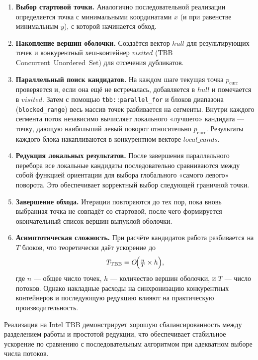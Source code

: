 \documentclass[12pt,a4paper]{article}
\begin{document}
\begin{enumerate}
  \item \textbf{Выбор стартовой точки.}  
    Аналогично последовательной реализации определяется точка с минимальными координатами \(x\) (и при равенстве минимальным \(y\)), с которой начинается обход.

  \item \textbf{Накопление вершин оболочки.}  
    Создаётся вектор \(\mathit{hull}\) для результирующих точек и конкурентный хеш‑контейнер \(\mathit{visited}\) (TBB Concurrent Unordered Set) для отсечения дубликатов.

  \item \textbf{Параллельный поиск кандидатов.}  
    На каждом шаге текущая точка \(p_{\mathrm{curr}}\) проверяется и, если она ещё не встречалась, добавляется в \(\mathit{hull}\) и помечается в \(\mathit{visited}\).  
    Затем с помощью \texttt{tbb::parallel\_for} и блоков диапазона (\texttt{blocked\_range}) весь массив точек разбивается на сегменты. Внутри каждого сегмента поток независимо вычисляет локального «лучшего» кандидата — точку, дающую наибольший левый поворот относительно \(p_{\mathrm{curr}}\). Результаты каждого блока накапливаются в конкурентном векторе \(\mathit{local\_cands}\).

  \item \textbf{Редукция локальных результатов.}  
    После завершения параллельного перебора все локальные кандидаты последовательно сравниваются между собой функцией ориентации для выбора глобального «самого левого» поворота. Это обеспечивает корректный выбор следующей граничной точки.

  \item \textbf{Завершение обхода.}  
    Итерации повторяются до тех пор, пока вновь выбранная точка не совпадёт со стартовой, после чего формируется окончательный список вершин выпуклой оболочки.

  \item \textbf{Асимптотическая сложность.}  
    При расчёте кандидатов работа разбивается на \(T\) блоков, что теоретически даёт ускорение до
    \[
      T_{\mathrm{TBB}} = O\!\Bigl(\tfrac{n}{T}\times h\Bigr),
    \]
    где \(n\) — общее число точек, \(h\) — количество вершин оболочки, и \(T\) — число потоков.  
    Однако накладные расходы на синхронизацию конкурентных контейнеров и последующую редукцию влияют на практическую производительность.
\end{enumerate}

Реализация на Intel TBB демонстрирует хорошую сбалансированность между разделением работы и простотой редукции, что обеспечивает стабильное ускорение по сравнению с последовательным алгоритмом при адекватном выборе числа потоков.
\end{document}
